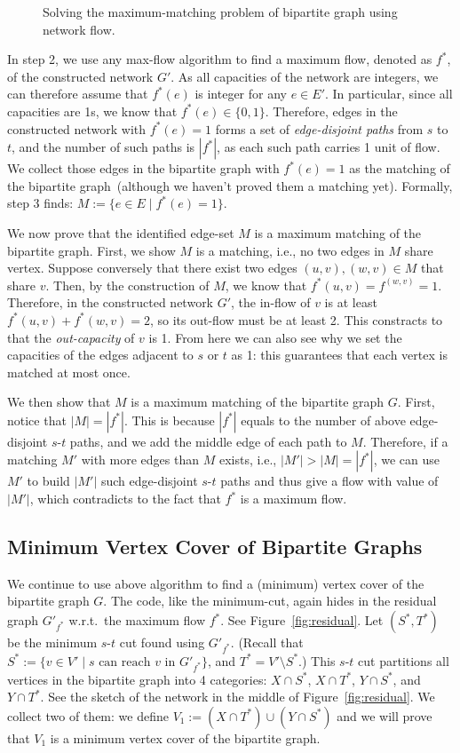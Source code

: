 \begin{figure}[h]
\centering{}
\caption{Solving the maximum-matching problem of bipartite graph using network flow.}
\label{fig:transform}
\end{figure}

In step 2, we use any max-flow algorithm to find a maximum flow, denoted as $f^*$,
of the constructed network $G'$. As all capacities of the network are integers,
we can therefore assume that $f^*(e)$ is integer for any $e\in E'$.
In particular, since all capacities are 1s, we know that $f^*(e) \in \{0, 1\}$.
Therefore, edges in the constructed network with $f^*(e) = 1$ forms a set of \emph{edge-disjoint paths}
from $s$ to $t$, and the number of such paths is $|f^*|$, as each such path
carries 1 unit of flow. We collect those edges in the bipartite graph with $f^*(e) = 1$
as the matching of the bipartite graph~(although we haven't proved them a matching yet).
Formally, step 3 finds: $M := \{e\in E\mid f^*(e) = 1\}$.


We now prove that the identified edge-set $M$ is a maximum matching of the bipartite graph.
First, we show $M$ is a matching, i.e., no two edges in $M$
share vertex. Suppose conversely that there exist two edges $(u,v), (w,v)\in M$ that share $v$.
Then, by the construction of $M$, we know that $f^*(u,v) = f^(w,v) = 1$.
Therefore, in the constructed network $G'$, the in-flow of $v$ is at least $f^*(u,v) + f^*(w,v) = 2$,
so its out-flow must be at least 2. This constracts to that the \emph{out-capacity} of $v$
is 1. From here we can also see why we set the capacities of the edges adjacent to $s$ or $t$
as 1: this guarantees that each vertex is matched at most once.

We then show that $M$ is a maximum matching of the bipartite graph $G$.
First, notice that $|M| = |f^*|$. This is because $|f^*|$ equals to the
number of above edge-disjoint $s$-$t$ paths, and we add the middle
edge of each path to $M$.  Therefore, if a matching $M'$ with more edges than $M$ exists, i.e., $|M'| > |M| = |f^*|$,
we can use $M'$ to build $|M'|$ such edge-disjoint $s$-$t$ paths and thus 
give a flow with value of $|M'|$, which contradicts to the fact that $f^*$ is a maximum flow.

\subsection*{Minimum Vertex Cover of Bipartite Graphs}

We continue to use above algorithm to find a (minimum) vertex cover of the bipartite graph $G$.
The code, like the minimum-cut, again hides in the residual graph $G'_{f^*}$ w.r.t.\ the maximum flow $f^*$.
See Figure~\ref{fig:residual}. Let $(S^*, T^*)$ be the minimum $s$-$t$ cut found using $G'_{f^*}$.
(Recall that $S^* := \{v\in V'\mid s \textrm{ can reach $v$ in } G'_{f^*} \}$, and $T^* = V'\setminus S^*$.)
This $s$-$t$ cut partitions all vertices in the bipartite graph into 4 categories:
$X\cap S^*$, $X\cap T^*$, $Y\cap S^*$, and $Y\cap T^*$.
See the sketch of the network in the middle of Figure~\ref{fig:residual}.
We collect two of them: we define $V_1 := (X\cap T^*)\cup (Y\cap S^*)$ 
and we will prove that $V_1$ is a minimum vertex cover of the bipartite graph.


